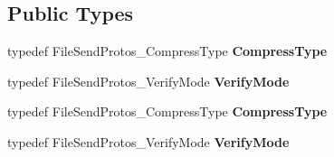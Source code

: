 \subsection*{Public Types}
\begin{DoxyCompactItemize}
\item 
\mbox{\label{classruntime_1_1FileSendProtos_af3749f2b7ce657a7df4a3156dbabefe8}} 
typedef File\+Send\+Protos\+\_\+\+Compress\+Type {\bfseries Compress\+Type}
\item 
\mbox{\label{classruntime_1_1FileSendProtos_ae373ee6c84df3e92ebb6821696a65521}} 
typedef File\+Send\+Protos\+\_\+\+Verify\+Mode {\bfseries Verify\+Mode}
\item 
\mbox{\label{classruntime_1_1FileSendProtos_af3749f2b7ce657a7df4a3156dbabefe8}} 
typedef File\+Send\+Protos\+\_\+\+Compress\+Type {\bfseries Compress\+Type}
\item 
\mbox{\label{classruntime_1_1FileSendProtos_ae373ee6c84df3e92ebb6821696a65521}} 
typedef File\+Send\+Protos\+\_\+\+Verify\+Mode {\bfseries Verify\+Mode}
\end{DoxyCompactItemize}
